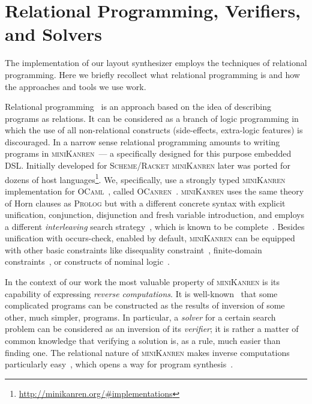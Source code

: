 
\section{Relational Programming, Verifiers, and Solvers}
\label{sec:rel}

The implementation of our layout synthesizer employs the techniques of relational programming. Here
we briefly recollect what relational programming is and how the approaches and tools we use work.

Relational programming~\cite{TRS} is an approach based on the idea of describing programs as
relations. It can be considered as a branch of logic programming in which the use of
all non-relational constructs (side-effects, extra-logic features) is discouraged. In a
narrow sense relational programming amounts to writing programs in \textsc{miniKanren}~--- a
specifically designed for this purpose embedded DSL. Initially developed for \textsc{Scheme}/\textsc{Racket}
\textsc{miniKanren} later was ported for dozens of host
languages\footnote{\url{http://minikanren.org/\#implementations}}.
We, specifically, use a strongly typed \textsc{miniKanren} implementation for \textsc{OCaml}~\cite{ocaml}, called \textsc{OCanren}~\cite{OCanren}.
\textsc{miniKanren} uses the same theory of Horn clauses as \textsc{Prolog} but with a different
concrete syntax with explicit unification, conjunction, disjunction and fresh variable introduction, and
employs a different \emph{interleaving} search strategy~\cite{interleaving}, which is known to be complete~\cite{certified}.
Besides unification with occurs-check, enabled by default, \textsc{miniKanren} can be equipped with other
basic constraints like disequality constraint~\cite{disuni}, finite-domain constraints~\cite{cKanren}, or
constructs of nominal logic~\cite{aKanren}.

In the context of our work the most valuable property of \textsc{miniKanren} is its capability of expressing \emph{reverse computations}.
It is well-known~\cite{SemanticsModifiers,SemanticsModifiers1} that some complicated programs can be constructed as
the results of inversion of some other, much simpler, programs. In particular, a \emph{solver} for a
certain search problem can be considered as an inversion of its \emph{verifier}; it is rather a matter of common knowledge that verifying a
solution is, as a rule, much easier than finding one. The relational nature of \textsc{miniKanren} makes
inverse computations particularly easy~\cite{searchproblems}, which opens a way for program
synthesis~\cite{Untagged,WBirdSeven,PatternMatching}.

